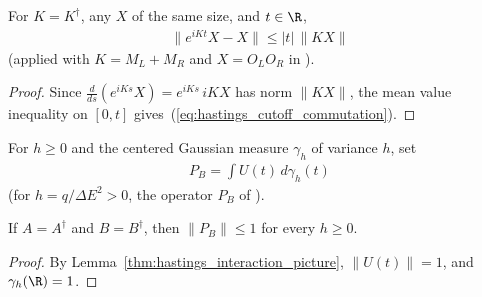 \begin{lemma}
    \label{thm:hastings_cutoff_commutation}
    \leanok
    For $K=K^\dagger$, any $X$ of the same size, and $t\in\R$,
    \begin{align}
        \|e^{iKt}X-X\|\leq|t|\,\|KX\|
        \label{eq:hastings_cutoff_commutation}
    \end{align}
    (applied with $K=M_L+M_R$ and $X=O_LO_R$ in
    \cite[lines 878--880]{Hastings2007AreaLaw}).
\end{lemma}
\begin{proof}\leanok
    Since $\frac d{ds}(e^{iKs}X)=e^{iKs}\,iKX$ has norm $\|KX\|$, the mean
    value inequality on $[0,t]$ gives~(\ref{eq:hastings_cutoff_commutation}).
\end{proof}

\begin{definition}
    \label{def:hastings_interaction_average}
    \leanok
    For $h\ge0$ and the centered Gaussian measure $\gamma_h$ of variance $h$,
    set
    \begin{align}
        P_B=\int U(t)\,d\gamma_h(t)
        \label{eq:hastings_interaction_average}
    \end{align}
    (for $h=q/\Delta E^2>0$, the operator $P_B$ of
    \cite[lines 891--897]{Hastings2007AreaLaw}).
\end{definition}

\begin{lemma}
    \label{thm:hastings_interaction_average_norm}
    \leanok
    If $A=A^\dagger$ and $B=B^\dagger$, then $\|P_B\|\leq1$ for every $h\ge0$.
\end{lemma}
\begin{proof}\leanok
    By Lemma~\ref{thm:hastings_interaction_picture}, $\|U(t)\|=1$, and
    $\gamma_h(\R)=1$.
\end{proof}

